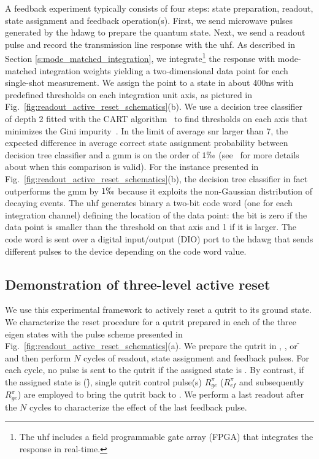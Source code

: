 A feedback experiment typically consists of four steps: state preparation, readout, state assignment and feedback operation(s). First, we send microwave pulses generated by the \gls{hdawg} to prepare the quantum state. Next, we send a readout pulse and record the transmission line response with the \gls{uhf}. As described in Section \ref{s:mode_matched_integration}, we integrate\footnote{The \gls{uhf} includes a field programmable gate array (FPGA) that integrates the response in real-time.} the response with mode-matched integration weights yielding a two-dimensional data point for each single-shot measurement. We assign the point to a state in about 400\unit{ns} with predefined thresholds on each integration unit axis, as pictured in Fig.~\ref{fig:readout_active_reset_schematics}(b). We use a decision tree classifier~\cite{Breiman1984} of depth 2 fitted with the CART algorithm~\cite{Breiman1984} to find thresholds on each axis that minimizes the Gini impurity~\cite{Bishop2006, Breiman1984}. In the limit of average \gls{snr} larger than 7, the expected difference in average correct state assignment probability between decision tree classifier and a \gls{gmm} is on the order of $1\permil$ (see~\cite{Lacroix2019} for more details about when this comparison is valid). For the instance presented in Fig.~\ref{fig:readout_active_reset_schematics}(b), the decision tree classifier in fact outperforms the \gls{gmm} by $1\permil$ because it exploits the non-Gaussian distribution of decaying events.
The \gls{uhf} generates binary a two-bit code word (one for each integration channel) defining the location of the data point: the bit is zero if the data point is smaller than the threshold on that axis and 1 if it is larger. The code word is sent over a digital input/output (DIO) port to the \gls{hdawg} that sends different pulses to the device depending on the code word value.

\subsection{Demonstration of three-level active reset}
We use this experimental framework to actively reset a qutrit to its ground state. We characterize the reset procedure for a qutrit prepared in each of the three eigen states with the pulse scheme presented in Fig.~\ref{fig:readout_active_reset_schematics}(a). We prepare the qutrit in \g, \e, or \f{} and then perform $N$ cycles of readout, state assignment and feedback pulses. For each cycle, no pulse is sent to the qutrit if the assigned state is \g. By contrast, if the assigned state is \e{} (\f), single qutrit control pulse(s) $R_{ge}^{\pi}$ ($R_{ef}^{\pi}$ and subsequently $R_{ge}^{\pi}$) are employed to bring the qutrit back to \g. We perform a last readout after the $N$ cycles to characterize the effect of the last feedback pulse.

